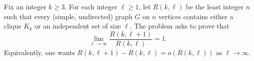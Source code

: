 Fix an integer $k\ge 3$. For each integer $\ell\ge 1$, let $R(k,\ell)$ be the least integer $n$ such that every (simple, undirected) graph $G$ on $n$ vertices contains either a clique $K_k$ or an independent set of size $\ell$. The problem asks to prove that
\[
\lim_{\ell\to\infty} \frac{R(k,\ell+1)}{R(k,\ell)} = 1.
\]
Equivalently, one wants $R(k,\ell+1)-R(k,\ell)=o(R(k,\ell))$ as $\ell\to\infty$.
